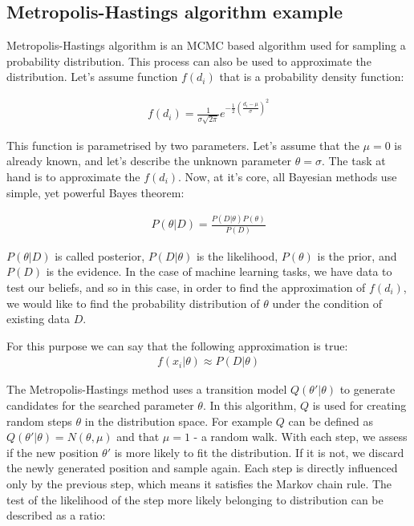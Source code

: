 \subsection{Metropolis-Hastings algorithm example}

Metropolis-Hastings algorithm  \cite{Robert2004} is an MCMC based algorithm used for sampling a probability distribution.
This process can also be used to approximate the distribution.
Let's assume function $f(d_{i})$ that is a probability density function:

\begin{align}
f(d_{i}) = \frac{1}{\sigma \sqrt{2\pi} } e^{-\frac{1}{2}\left(\frac{d_{i}-\mu}{\sigma}\right)^2}
  \end{align}

This function is parametrised by two parameters.
Let's assume that the $\mu = 0$ is already known, and let's describe the unknown parameter $\theta = \sigma$.
The task at hand is to approximate the $f(d_i)$.
Now, at it's core, all Bayesian methods use simple, yet powerful Bayes theorem:

\begin{align}
  P(\theta|D) = \frac{P(D|\theta)P(\theta)}{P(D)}
\end{align}

$P(\theta|D)$ is called posterior, $P(D|\theta)$ is the likelihood, $P(\theta)$ is the prior, and $P(D)$ is the evidence.
In the case of machine learning tasks, we have data to test our beliefs, and so in this case, in order to find the approximation of $f(d_{i})$, we would like to find the probability distribution of $\theta$ under the condition of existing data $D$.

For this purpose we can say that the following approximation is true:
\begin{align}
f(x_{i} | \theta) \approx P(D|\theta)
  \end{align}

The Metropolis-Hastings method uses a transition model $Q(\theta'|\theta)$ to generate candidates for the searched parameter $\theta$.
In this algorithm, $Q$ is used for creating random steps $\theta$ in the distribution space.
For example $Q$ can be defined as $Q(\theta'|\theta)=N(\theta, \mu)$ and that $\mu=1$ - a random walk.
With each step, we assess if the new position $\theta'$ is more likely to fit the distribution.
If it is not, we discard the newly generated position and sample again.
Each step is directly influenced only by the previous step, which means it satisfies the Markov chain rule.
The test of the likelihood of the step more likely belonging to distribution can be described as a ratio:

